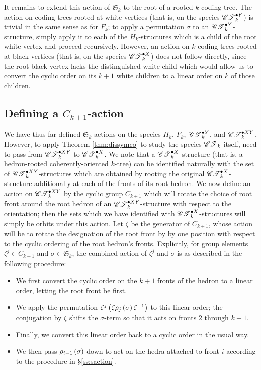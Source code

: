 \documentclass[sectionflow,singlespace,twoside,boldmathhdr]{brandiss} %
\numberwithin{section}{chapter}
\numberwithin{figure}{chapter}
\begin{document}
It remains to extend this action of $\mathfrak{S}_{k}$ to the root of a rooted $k$-coding tree.
The action on coding trees rooted at white vertices (that is, on the species $\pointed[Y]{\specname{CT}}_{k}$) is trivial in the same sense as for $F_{k}$; to apply a permutation $\sigma$ to an $\pointed[Y]{\specname{CT}}_{k}$-structure, simply apply it to each of the $H_{k}$-structures which is a child of the root white vertex and proceed recursively.
However, an action on $k$-coding trees rooted at black vertices (that is, on the species $\pointed[X]{\specname{CT}}_{k}$) does not follow directly, since the root black vertex lacks the distinguished white child which would allow us to convert the cyclic order on its $k+1$ white children to a linear order on $k$ of those children.

\subsection{Defining a $C_{k+1}$-action}\label{ss:zaction}
We have thus far defined $\mathfrak{S}_{k}$-actions on the species $H_{k}$, $F_{k}$, $\pointed[Y]{\specname{CT}}_{k}$, and $\pointed[XY]{\specname{CT}}_{k}$.
However, to apply Theorem \ref{thm:dissymco} to study the species $\specname{CT}_{k}$ itself, need to pass from $\pointed[XY]{\specname{CT}}_{k}$ to $\pointed[X]{\specname{CT}}_{k}$.
We note that a $\pointed[X]{\specname{CT}}_{k}$-structure (that is, a hedron-rooted coherently-oriented $k$-tree) can be identified naturally with the set of $\pointed[XY]{\specname{CT}}_{k}$-structures which are obtained by rooting the original $\pointed[X]{\specname{CT}}_{k}$-structure additionally at each of the fronts of its root hedron.
We now define an action on $\pointed[XY]{\specname{CT}}_{k}$ by the cyclic group $C_{k+1}$ which will rotate the choice of root front around the root hedron of an $\pointed[XY]{\specname{CT}}_{k}$-structure with respect to the orientation; then the sets which we have identified with $\pointed[X]{\specname{CT}}_{k}$-structures will simply be orbits under this action.
Let $\zeta$ be the generator of $C_{k+1}$, whose action will be to rotate the designation of the root front by by one position with respect to the cyclic ordering of the root hedron's fronts.
Explicitly, for group elements $\zeta^{j} \in C_{k+1}$ and $\sigma \in \mathfrak{S}_{k}$, the combined action of $\zeta^{j}$ and $\sigma$ is as described in the following procedure:
\begin{itemize}
\item We first convert the cyclic order on the $k+1$ fronts of the hedron to a linear order, letting the root front be first.
\item We apply the permutation $\zeta^{j} \pbrac{\zeta \rho_{j} \pbrac{\sigma} \zeta^{-1}}$ to this linear order; the conjugation by $\zeta$ shifts the $\sigma$-term so that it acts on fronts $2$ through $k+1$.
\item Finally, we convert this linear order back to a cyclic order in the usual way.  
\item We then pass $\rho_{i - 1} \pbrac{\sigma}$ down to act on the hedra attached to front $i$ according to the procedure in \S \ref{ss:saction}.
\end{itemize}
\end{document}
